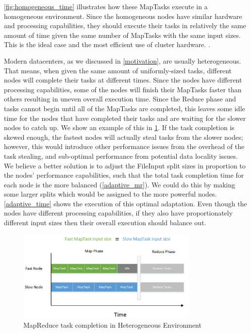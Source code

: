 \ref{fig:homogeneous_time} illustrates how these MapTasks execute in a homogeneous environment. Since the homogeneous nodes have
similar hardware and processing capabilities, they should execute their tasks in relatively the same amount of
time given the same number of MapTasks with the same input sizes. This is the ideal case and the most efficient use of cluster hardware.
. 


Modern datacenters, as we discussed in \ref{motivation}, are usually heterogeneous. That means,
when given the same amount of uniformly-sized tasks, different nodes will complete their tasks 
at different times. Since the nodes
have different processing capabilities, some of the nodes will finish their MapTasks faster than others
resulting in uneven overall execution time. Since the Reduce phase and tasks cannot begin until all of
the MapTasks are completed, this leaves some idle time for the nodes that have completed their tasks and
are waiting for the slower nodes to catch up. We show an example of this in \ref{fig:heterogeneous_time}.
If the task completion
is skewed enough, the fastest nodes will actually steal tasks from the slower nodes; however,
this would introduce other performance issues from the overhead of the task stealing, and
sub-optimal performance from potential data locality issues. We believe a better solution is to
adjust the FileInput split sizes in proportion to the nodes' performance capabilities, such that
the total task completion time for each node is the more balanced (\ref{adaptive_mr}). We could do this by making some larger
splits which would be assigned to the more powerful nodes. \ref{adaptive_time} shows the execution of this optimal adaptation. Even though the nodes have different processing
capabilities, if they also have proportionately different input sizes then their overall execution should balance out.

\begin{figure}[ht!]
\centering
\includegraphics[width=90mm]{heterogeneous_time.jpg}
\caption{MapReduce task completion in Heterogeneous Environment}
\label{fig:heterogeneous_time}
\end{figure}

